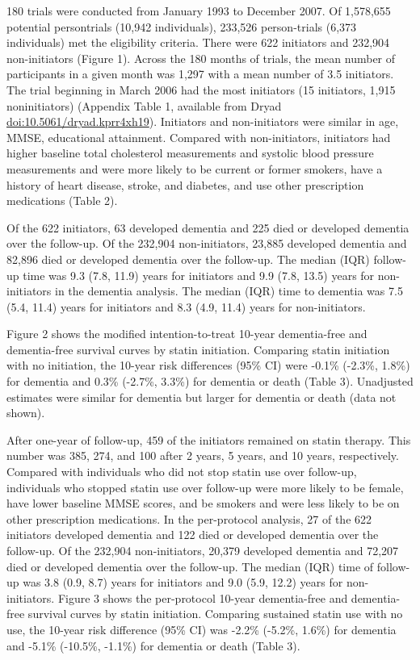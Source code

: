 \documentclass[
]{book}
\begin{document}
180 trials were conducted from January 1993 to December 2007. Of 1,578,655 potential persontrials (10,942 individuals), 233,526 person-trials (6,373 individuals) met the eligibility criteria. There were 622 initiators and 232,904 non-initiators (Figure 1). Across the 180 months of trials, the mean number of participants in a given month was 1,297 with a mean number of 3.5 initiators. The trial beginning in March 2006 had the most initiators (15 initiators, 1,915 noninitiators) (Appendix Table 1, available from Dryad \url{doi:10.5061/dryad.kprr4xh19}). Initiators and non-initiators were similar in age, MMSE, educational attainment. Compared with non-initiators, initiators had higher baseline total cholesterol measurements and systolic blood pressure measurements and were more likely to be current or former smokers, have a history of heart disease, stroke, and diabetes, and use other prescription medications (Table 2).

Of the 622 initiators, 63 developed dementia and 225 died or developed dementia over the follow-up. Of the 232,904 non-initiators, 23,885 developed dementia and 82,896 died or developed dementia over the follow-up. The median (IQR) follow-up time was 9.3 (7.8, 11.9) years for initiators and 9.9 (7.8, 13.5) years for non-initiators in the dementia analysis. The median (IQR) time to dementia was 7.5 (5.4, 11.4) years for initiators and 8.3 (4.9, 11.4) years for non-initiators.

Figure 2 shows the modified intention-to-treat 10-year dementia-free and dementia-free survival curves by statin initiation. Comparing statin initiation with no initiation, the 10-year risk differences (95\% CI) were -0.1\% (-2.3\%, 1.8\%) for dementia and 0.3\% (-2.7\%, 3.3\%) for dementia or death (Table 3). Unadjusted estimates were similar for dementia but larger for dementia or death (data not shown).

After one-year of follow-up, 459 of the initiators remained on statin therapy. This number was 385, 274, and 100 after 2 years, 5 years, and 10 years, respectively. Compared with individuals who did not stop statin use over follow-up, individuals who stopped statin use over follow-up were more likely to be female, have lower baseline MMSE scores, and be smokers and were less likely to be on other prescription medications. In the per-protocol analysis, 27 of the 622 initiators developed dementia and 122 died or developed dementia over the follow-up. Of the 232,904 non-initiators, 20,379 developed dementia and 72,207 died or developed dementia over the follow-up. The median (IQR) time of follow-up was 3.8 (0.9, 8.7) years for initiators and 9.0 (5.9, 12.2) years for non-initiators. Figure 3 shows the per-protocol 10-year dementia-free and dementia-free survival curves by statin initiation. Comparing sustained statin use with no use, the 10-year risk difference (95\% CI) was -2.2\% (-5.2\%, 1.6\%) for dementia and -5.1\% (-10.5\%, -1.1\%) for dementia or death (Table 3).
\end{document}
